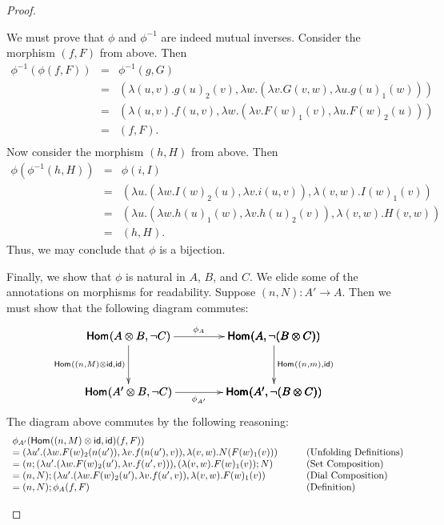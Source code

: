 \begin{proof}
\begin{itemize}
    We must prove that $\phi$ and $\phi^{-1}$ are indeed
    mutual inverses.  Consider the morphism $(f,F)$ from above.  Then
    \[
    \begin{array}{lll}
      \phi^{-1}(\phi(f,F))
      & = & \phi^{-1}(g,G)\\
      & = & (\lambda(u,v).g(u)_2(v),\lambda w.(\lambda v.G(v,w), \lambda u.g(u)_1(w)))\\
      & = & (\lambda(u,v).f(u,v),\lambda w.(\lambda v.F(w)_1(v), \lambda u.F(w)_2(u)))\\
      & = & (f,F).\\
    \end{array}
    \]
    Now consider the morphism $(h,H)$ from above.  Then
    \[
    \begin{array}{lll}
      \phi(\phi^{-1}(h,H))
      & = & \phi(i,I)\\
      & = & (\lambda u.(\lambda w.I(w)_2(u),\lambda v.i(u,v)), \lambda (v,w).I(w)_1(v))\\
      & = & (\lambda u.(\lambda w.h(u)_1(w),\lambda v.h(u)_2(v)), \lambda (v,w).H(v,w))\\
      & = & (h,H).
    \end{array}
    \]
    Thus, we may conclude that $\phi$ is a bijection.

    Finally, we show that $\phi$ is natural in $A$, $B$, and $C$.  We
    elide some of the annotations on morphisms for
    readability. Suppose $(n,N) : A' \to A$.  Then we must show that
    the following diagram commutes:
    \[\bfig
    \hSquares|allrrrr|/->``->`->``->`/[\homs{}{A \otimes B}{\lnot C}`\homs{}{A}{\lnot (B \otimes C)}``\homs{}{A' \otimes B}{\lnot C}`\homs{}{A'}{\lnot (B \otimes C)}`;\phi_A``\homs{}{(n,M) \otimes \id}{\id}`\homs{}{(n,m)}{\id}``\phi_{A'}`]
    \efig\]
    The diagram above commutes by the following reasoning:
    \[\begin{array}{llllllll}
    \phi_{A'}(\mathsf{Hom}_{\mathcal{}}((n,M) \otimes \mathsf{id},\mathsf{id})(f,F))\\
    = (\lambda u'.(\lambda w.F(w)_2(n(u')),\lambda v.f(n(u'),v)), \lambda (v,w).N(F(w)_1(v))) & \quad & \text{(Unfolding Definitions)}\\
    = (n;(\lambda u'.(\lambda w.F(w)_2(u'),\lambda v.f(u',v))), (\lambda (v,w).F(w)_1(v));N) & \quad & \text{(Set Composition)}\\
    = (n,N);(\lambda u'.(\lambda w.F(w)_2(u'),\lambda v.f(u',v)), \lambda (v,w).F(w)_1(v)) & \quad & \text{(Dial Composition)}\\
    = (n,N);\phi_A(f,F) & \quad & \text{(Definition)}\\
    \end{array}\]


\end{itemize}
\end{proof}
